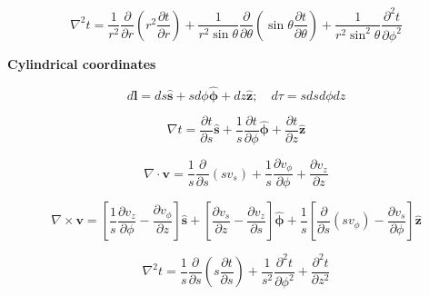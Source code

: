 \documentclass[11pt]{article}
\begin{document}
\[
\nabla ^ { 2 } t = \frac { 1 } { r ^ { 2 } } \frac { \partial } { \partial r } \left( r ^ { 2 } \frac { \partial t } { \partial r } \right) + \frac { 1 } { r ^ { 2 } \sin \theta } \frac { \partial } { \partial \theta } \left( \sin \theta \frac { \partial t } { \partial \theta } \right) + \frac { 1 } { r ^ { 2 } \sin ^ { 2 } \theta } \frac { \partial ^ { 2 } t } { \partial \phi ^ { 2 } }
\]



{\bf Cylindrical coordinates}

\[
d \mathbf { l } = d s \hat { \mathbf { s } } + s d \phi \hat { \boldsymbol { \phi } } + d z \hat { \mathbf { z } } ; \quad d \tau = s d s d \phi d z
\]


\[
\nabla t = \frac { \partial t } { \partial s } \hat { \mathbf { s } } + \frac { 1 } { s } \frac { \partial t } { \partial \phi } \hat { \boldsymbol { \phi } } + \frac { \partial t } { \partial z } \mathbf { \hat { z } }
\]


\[
\nabla \cdot \mathbf { v } = \frac { 1 } { s } \frac { \partial } { \partial s } \left( s v _ { s } \right) + \frac { 1 } { s } \frac { \partial v _ { \phi } } { \partial \phi } + \frac { \partial v _ { z } } { \partial z }
\]


\[
\nabla \times \mathbf { v } = \left[ \frac { 1 } { s } \frac { \partial v _ { z } } { \partial \phi } - \frac { \partial v _ { \phi } } { \partial z } \right] \hat { \mathbf { s } } + \left[ \frac { \partial v _ { s } } { \partial z } - \frac { \partial v _ { z } } { \partial s } \right] \hat { \boldsymbol { \phi } } + \frac { 1 } { s } \left[ \frac { \partial } { \partial s } \left( s v _ { \phi } \right) - \frac { \partial v _ { s } } { \partial \phi } \right] \hat { \mathbf { z } }
\]


\[
\nabla ^ { 2 } t = \frac { 1 } { s } \frac { \partial } { \partial s } \left( s \frac { \partial t } { \partial s } \right) + \frac { 1 } { s ^ { 2 } } \frac { \partial ^ { 2 } t } { \partial \phi ^ { 2 } } + \frac { \partial ^ { 2 } t } { \partial z ^ { 2 } }
\]


\pagebreak
\end{document}
